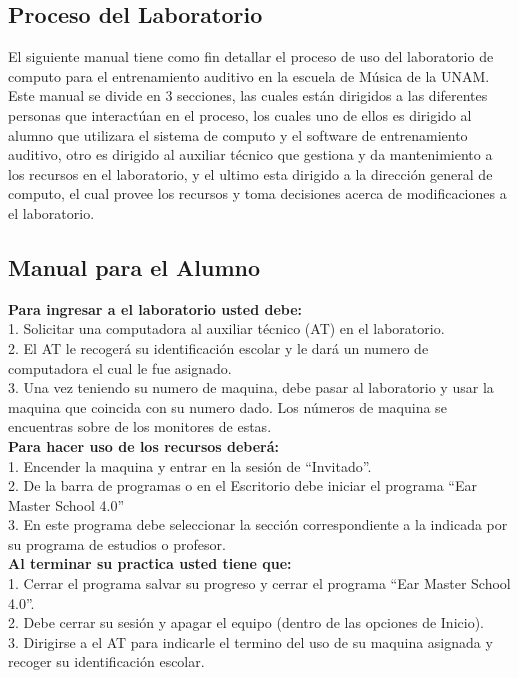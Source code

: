 \documentclass[spanish,12pt,letterpapper]{article}
\begin{document}
	\subsection{Proceso del Laboratorio}
	El siguiente manual tiene como fin detallar el proceso de uso del laboratorio de computo para el entrenamiento auditivo en la escuela de Música de la UNAM.\\
	
	Este manual se divide en 3 secciones, las cuales están dirigidos a las diferentes personas que interactúan en el proceso, los cuales uno de ellos es dirigido al alumno que utilizara el sistema de computo y el software de entrenamiento auditivo, otro es dirigido al auxiliar técnico que gestiona y da mantenimiento a los recursos en el laboratorio, y el ultimo esta dirigido a la dirección general de computo, el cual provee los recursos y toma decisiones acerca de modificaciones a el laboratorio.  
	
	\subsection{Manual para el Alumno}
	\textbf{Para ingresar a el laboratorio usted debe:\\}
	1. Solicitar una computadora al auxiliar técnico (AT) en el laboratorio.\\	
	2. El AT le recogerá su identificación escolar y le dará un numero de computadora el cual le fue asignado.\\
	3. Una vez teniendo su numero de maquina, debe pasar al laboratorio y usar la maquina que coincida con su numero dado. Los números de maquina se encuentras sobre de los monitores de estas.\\
	
	\textbf{Para hacer uso de los recursos deberá:\\}
	1. Encender la maquina y entrar en la sesión de ``Invitado''.\\
	2. De la barra de programas o en el Escritorio debe iniciar el programa ``Ear Master School 4.0''\\
	3. En este programa debe seleccionar la sección correspondiente a la indicada por su programa de estudios o profesor.\\
	
	\textbf{Al terminar su practica usted tiene que:\\}
	1. Cerrar el programa salvar su progreso y cerrar el programa ``Ear Master School 4.0''.\\
	2. Debe cerrar su sesión y apagar el equipo (dentro de las opciones de Inicio).\\ 
	3. Dirigirse a el AT para indicarle el termino del uso de su maquina asignada y recoger su identificación escolar.\\
	
\end{document}
